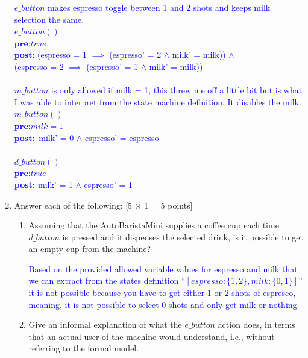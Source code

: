 \documentclass[12pt,fleqn]{article}
\begin{document}
\begin{enumerate}
\textcolor{blue}{
  $e\_button$ makes espresso toggle between 1 and 2 shots and keeps milk selection the same. \\
  $e\_button()$ \\
  $\textbf{pre:} true$  \\
  $\textbf{post:}$ (espresso = 1 $\implies$ (espresso' = 2 $\land$ milk' = milk)) $\land$ \\
                   (espresso = 2 $\implies$ (espresso' = 1 $\land$ milk' = milk)) \\
  \\
  $m\_button$ is only allowed if milk = 1, this threw me off a little bit but is what I was able to interpret from the state machine definition. It disables the milk.\\
  $m\_button()$ \\
  $\textbf{pre:} milk = 1$  \\
  $\textbf{post}:$ milk' = 0 $\land$ espresso' = espresso \\
  \\
  $d\_button()$ \\
  $\textbf{pre:} true$  \\
  \textbf{post:} milk' = 1 $\land$ espresso' = 1 \\}


\clearpage

\item Answer each of the following: [5 $\times$ 1 = 5 points]
\begin{enumerate}
\item Assuming that the $\mathrm{AutoBaristaMini}$ supplies a coffee cup each time $d\_button$ is pressed and it dispenses the selected drink, is it possible to get an empty cup from the machine?

\textcolor{blue}{Based on the provided allowed variable values for espresso and milk that we can extract from the states definition ``$[ espresso : \{ 1, 2 \}, milk : \{ 0, 1 \} ]$''  it is not possible because you have to get either 1 or 2 shots of espreseo, meaning, it is not possible to select 0 shots and only get milk or nothing. }  


\item Give an informal explanation of what the $e\_button$ action does, in terms that an actual user of the machine would understand, i.e., without referring to the formal model.


\end{enumerate}
\end{enumerate}
\end{document}
